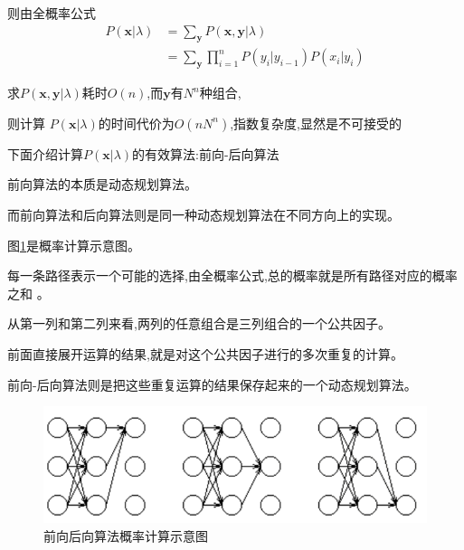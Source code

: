 \documentclass[UTF8,a4paper]{ctexart}%
\begin{document}
            则由全概率公式
            \begin{equation}\begin{split}
                P(\bm{x}|\lambda) &= \sum_{\bm{y}}P(\bm{x,y}|\lambda) \\
                &= \sum_{\bm{y}} \prod_{i = 1}^n P(y_{i}|y_{i-1})P(x_i|y_{i})
            \end{split}\end{equation}

            求$P(\bm{x,y}|\lambda)$耗时$O(n)$,而$\bm{y}$有$N^n$种组合,

            则计算 $P(\bm{x}|\lambda)$的时间代价为{\color{red}$O(nN^n)$},指数复杂度,显然是不可接受的

            下面介绍计算$P(\bm{x}|\lambda)$的有效算法:前向-后向算法

            {\color{blue}
                前向算法的本质是动态规划算法。

                而前向算法和后向算法则是同一种动态规划算法在不同方向上的实现。
            }


            图\ref{fig2017-5-1819:40:09}是概率计算示意图。

            每一条路径表示一个可能的选择,由全概率公式,总的概率就是所有路径对应的概率之和 。

            从第一列和第二列来看,两列的任意组合是三列组合的一个公共因子。

            前面直接展开运算的结果,就是对这个公共因子进行的多次重复的计算。

            前向-后向算法则是把这些重复运算的结果保存起来的一个动态规划算法。

            \begin{figure}[!htbp]
              \centering
              \includegraphics[scale=0.5]{assets/jiqixuexi4_36b94.png}
              \caption{前向后向算法概率计算示意图}
              \label{fig2017-5-1819:40:09}
            \end{figure}
\end{document}
